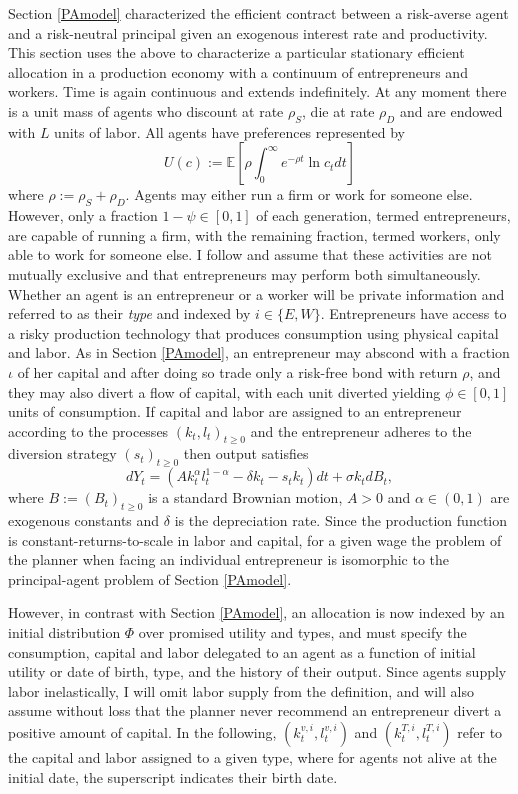 \documentclass[11pt]{article}
\theoremstyle{plain}
\theoremstyle{definition} %
\begin{document}
Section \ref{PAmodel} characterized the efficient contract between a risk-averse agent and a risk-neutral principal given an exogenous interest rate and productivity. This section uses the above to characterize a particular stationary efficient allocation in a production economy with a continuum of entrepreneurs and workers. Time is again continuous and extends indefinitely. At any moment there is a unit mass of agents who discount at rate $\rho_S$, die at rate $\rho_D$ and are endowed with $L$ units of labor. All agents have preferences represented by 
$$
U(c) := \mathbb{E}{\left[\rho\int_{0}^{\infty}e^{-\rho t}\ln c_tdt\right]}
$$ 
where $\rho := \rho_S + \rho_D$. Agents may either run a firm or work for someone else. However, only a fraction $1 - \psi \in [0,1]$ of each generation, termed entrepreneurs, are capable of running a firm, with the remaining fraction, termed workers, only able to work for someone else. I follow \cite{angeletos_uninsured_2007} and assume that these activities are not mutually exclusive and that entrepreneurs may perform both simultaneously. Whether an agent is an entrepreneur or a worker will be private information and referred to as their \textit{type} and indexed by $i\in \{E,W\}$. Entrepreneurs have access to a risky production technology that produces consumption using physical capital and labor. As in Section \ref{PAmodel}, an entrepreneur may abscond with a fraction $\iota$ of her capital and after doing so trade only a risk-free bond with return $\rho$, and they may also divert a flow of capital, with each unit diverted yielding $\phi \in [0,1]$ units of consumption. If capital and labor are assigned to an entrepreneur according to the processes $(k_t, l_t)_{t\geq0}$ and the entrepreneur adheres to the diversion strategy $(s_t)_{t\geq0}$ then output satisfies 
$$
dY_t = {\left(Ak_t^{\alpha}l_t^{1-\alpha} - \delta k_t - s_tk_t\right)}dt + \sigma k_t dB_t,
$$
where $B := (B_t)_{t\geq0}$ is a standard Brownian motion, $A>0$ and $\alpha \in (0,1)$ are exogenous constants and $\delta$ is the depreciation rate. Since the production function is constant-returns-to-scale in labor and capital, for a given wage the problem of the planner when facing an individual entrepreneur is isomorphic to the principal-agent problem of Section \ref{PAmodel}.

However, in contrast with Section \ref{PAmodel}, an allocation is now indexed by an initial distribution $\Phi$ over promised utility and types, and must specify the consumption, capital and labor delegated to an agent as a function of initial utility or date of birth, type, and the history of their output. Since agents supply labor inelastically, I will omit labor supply from the definition, and will also assume without loss that the planner never recommend an entrepreneur divert a positive amount of capital. In the following, $(k^{v,i}_t, l^{v,i}_t)$ and $(k^{T,i}_t, l^{T,i}_t)$ refer to the capital and labor assigned to a given type, where for agents not alive at the initial date, the superscript indicates their birth date. 
\end{document}
